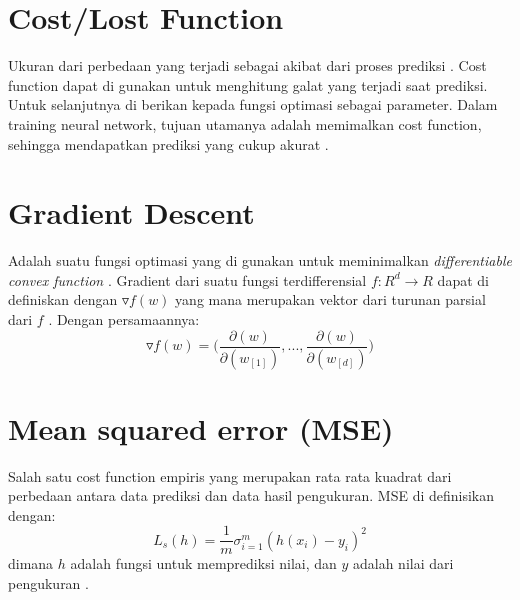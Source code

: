 \section{Cost/Lost Function}
    Ukuran dari perbedaan yang terjadi sebagai akibat dari proses prediksi \cite{MLBishop}. Cost function dapat di gunakan untuk menghitung galat yang terjadi saat prediksi. Untuk selanjutnya di berikan kepada fungsi optimasi sebagai parameter. Dalam training neural network, tujuan utamanya adalah memimalkan cost function, sehingga mendapatkan prediksi yang cukup akurat \cite{bishop}.
\section{Gradient Descent}
    Adalah suatu fungsi optimasi yang di gunakan untuk meminimalkan \emph{differentiable convex function} \cite{ShaiUnderstandingMachineLearning}. Gradient dari suatu fungsi terdifferensial $f : R^d \rightarrow R$ dapat di definiskan dengan $\triangledown f(w)$ yang mana merupakan vektor dari turunan parsial dari $f$ \cite{ShaiUnderstandingMachineLearning}. Dengan persamaannya:
    \begin{equation}
        \triangledown f(w) = \Big( \frac{\partial(w)}{\partial(w_{[1]})} ,... ,\frac{\partial(w)}{\partial(w_{[d]})} \Big)
    \end{equation}
\section{Mean squared error (MSE)}
    Salah satu cost function empiris yang merupakan rata rata kuadrat dari perbedaan antara data prediksi dan data hasil pengukuran. MSE di definisikan dengan:
    \begin{equation}
        L_s(h) = \frac{1}{m}\sigma^m_{i=1}(h(x_i) - y_i)^2
    \end{equation}
    dimana $h$ adalah fungsi untuk memprediksi nilai, dan $y$ adalah nilai dari pengukuran \cite{ShaiUnderstandingMachineLearning}. 
